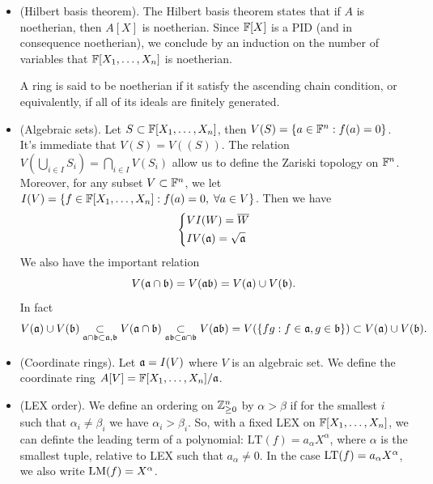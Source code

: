 \begin{itemize}
    \item(Hilbert basis theorem). The Hilbert basis theorem states that if $A$ is noetherian, then $A[X]$ is noetherian. 
    Since $\mathbb{F}[X]$ is a PID (and in consequence noetherian), we conclude by an induction on the number of variables that 
    $\mathbb{F}[X_1,\dots, X_n]$ is noetherian. 

    \begin{remark}
        A ring is said to be noetherian if it satisfy the ascending chain condition, or equivalently, 
         if all of its ideals are finitely generated.
    \end{remark}
    \item(Algebraic sets). Let $S \subset \mathbb{F}[X_1,\dots, X_n]$, then $V(S) = \{a\in\mathbb{F}^n: f(a)=0\}$. It's 
    immediate that $V(S) = V((S))$. The relation $V(\bigcup_{i\in I}S_i)=\bigcap_{i\in I}V(S_i)$ allow us 
    to define the Zariski topology on $\mathbb{F}^n$. 
    Moreover, for any subset $V\subset \mathbb{F}^n$, we let 
    $I(V)=\{f\in\mathbb{F}[X_1,\dots,X_n]: f(a)=0,\;\forall a\in V\}$. Then we have 
    \begin{equation}
       \left\{ \begin{aligned}
            &VI(W) = \overline{W}\\
            &IV(\mathfrak{a}) = \sqrt{\mathfrak{a}}
        \end{aligned}\right.
    \end{equation}
    We also have the important relation
    \begin{equation}
        V(\mathfrak{a}\cap\mathfrak{b}) = V(\mathfrak{a}\mathfrak{b}) = V(\mathfrak{a})\cup V(\mathfrak{b}).
    \end{equation}
    In fact 
    \begin{equation}
        V(\mathfrak{a})\cup V(\mathfrak{b})\underset{\mathfrak{a}\cap\mathfrak{b}\subset \mathfrak{a},\mathfrak{b}}{\subset}
        V(\mathfrak{a}\cap\mathfrak{b})\underset{\mathfrak{a}\mathfrak{b}\subset\mathfrak{a}\cap\mathfrak{b}}{\subset}V(\mathfrak{a}\mathfrak{b})
        =V(\{fg:f\in\mathfrak{a},g\in\mathfrak{b}\})\subset V(\mathfrak{a})\cup V(\mathfrak{b}).
    \end{equation}

    \item(Coordinate rings). Let $\mathfrak{a} = I(V)$ where $V$ is an algebraic set. We define the coordinate ring 
    $A[V] = \mathbb{F}[X_1,\dots, X_n]/\mathfrak{a}$.

    \item(LEX order). We define an ordering on $\mathbb{Z}_{\geq0}^n$ by $\alpha > \beta$ if 
    for the smallest $i$ such that $\alpha_i\neq \beta_i$ we have $\alpha_i > \beta_i$. So, with a 
    fixed LEX on $\mathbb{F}[X_1,\dots, X_n]$, we can definte the leading term of a polynomial: 
    $\text{LT}(f) = a_\alpha X^\alpha$, where $\alpha$ is the smallest tuple, relative to LEX such that 
    $a_\alpha\neq0$. In the case $\text{LT}(f) = a_\alpha X^\alpha$, we also write $\text{LM}(f) =X^\alpha$.


\end{itemize}
